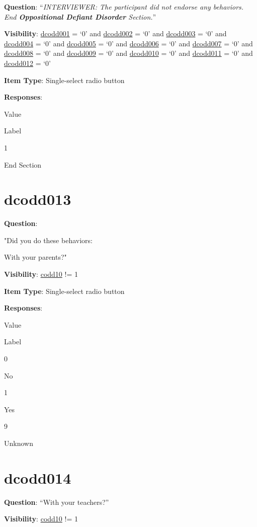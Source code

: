 \documentclass[]{book}
\begin{document}
\textbf{Question}: ``\emph{INTERVIEWER: The participant did not endorse any behaviors. End \textbf{Oppositional Defiant Disorder} Section.}''

\textbf{Visibility}: \protect\hyperlink{dcodd001}{dcodd001} = `0' and \protect\hyperlink{dcodd002}{dcodd002} = `0' and \protect\hyperlink{dcodd003}{dcodd003} = `0' and \protect\hyperlink{dcodd004}{dcodd004} = `0' and \protect\hyperlink{dcodd005}{dcodd005} = `0' and \protect\hyperlink{dcodd006}{dcodd006} = `0' and \protect\hyperlink{dcodd007}{dcodd007} = `0' and \protect\hyperlink{dcodd008}{dcodd008} = `0' and \protect\hyperlink{dcodd009}{dcodd009} = `0' and \protect\hyperlink{dcodd010}{dcodd010} = `0' and \protect\hyperlink{dcodd011}{dcodd011} = `0' and \protect\hyperlink{dcodd012}{dcodd012} = `0'

\textbf{Item Type}: Single-select radio button

\textbf{Responses}:

Value

Label

1

End Section

\hypertarget{dcodd013}{%
\section{dcodd013}\label{dcodd013}}

\textbf{Question}:

"Did you do these behaviors:

With your parents?"

\textbf{Visibility}: \protect\hyperlink{codd10}{codd10} != 1

\textbf{Item Type}: Single-select radio button

\textbf{Responses}:

Value

Label

0

No

1

Yes

9

Unknown

\hypertarget{dcodd014}{%
\section{dcodd014}\label{dcodd014}}

\textbf{Question}: ``With your teachers?''

\textbf{Visibility}: \protect\hyperlink{codd10}{codd10} != 1
\end{document}
